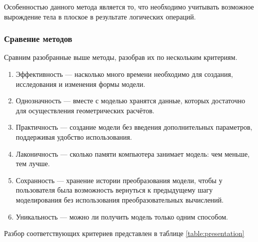 Особенностью данного метода является то, что необходимо учитывать 
возможное вырождение тела в плоское в результате логических операций.


\subsubsection{Сравение методов}

Сравним разобранные выше методы, разобрав их по нескольким 
критериям.
\begin{enumerate}[leftmargin=1.6\parindent,label=\arabic*.]
	\item Эффективность --- насколько много времени необходимо для создания, 
	исследования и изменения формы модели.
	\item Однозначность --- вместе с моделью хранятся данные, которых 
	достаточно для осуществления геометрических расчётов.
	\item Практичность --- создание модели без введения дополнительных 
	параметров, поддерживая удобство использования.
	\item Лаконичность --- сколько памяти компьютера занимает модель: чем 
	меньше, тем лучше.
	\item Сохранность --- хранение истории преобразования модели, чтобы у 
	пользователя была возможность вернуться к предыдущему шагу 
	моделирования без использования преобразовательных вычислений.
	\item Уникальность --- можно ли получить модель только одним способом.
\end{enumerate}

Разбор соответствующих критериев представлен в таблице \ref{table:presentation}
\clearpage

